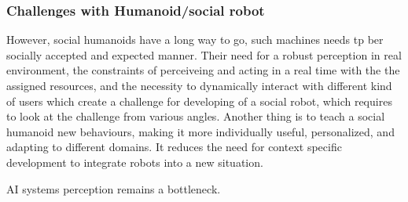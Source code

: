 \subsubsection{}
\subsubsection{Challenges with Humanoid/social robot}

However,  social humanoids have a long way to go, such machines needs tp ber socially accepted and expected manner. Their need for a robust perception in real environment, the constraints of perceiveing and acting in a real time with the the assigned resources, and the necessity to dynamically interact with different kind of users which create a challenge for developing of a social robot, which requires to look at the challenge from various angles. Another thing is to teach a social humanoid new behaviours, making it  more individually useful, personalized, and adapting to different domains. It reduces the need for context specific development to integrate robots into a new situation\cite{Alexandre}.

AI systems perception remains a bottleneck.



